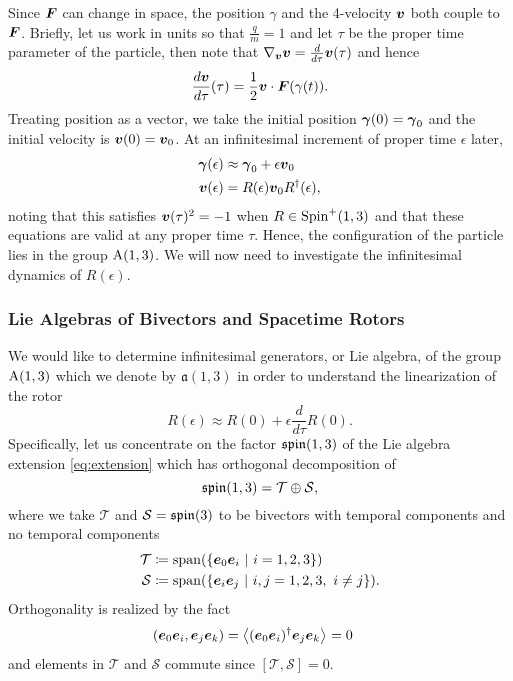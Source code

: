 \documentclass[conf]{new-aiaa}
\begin{document}
Since $\boldsymbol{F}$ can change in space, the position $\gamma$ and the 4-velocity $\boldsymbol{v}$ both couple to $\boldsymbol{F}$. Briefly, let us work in units so that $\frac{q}{m}=1$ and let $\tau$ be the proper time parameter of the particle, then note that $\nabla_{\boldsymbol{v}}\boldsymbol{v}=\frac{d}{d\tau} \boldsymbol{v}(\tau)$ and hence
\begin{equation}
    \label{eq:faraday_transport}
    \frac{d\boldsymbol{v}}{d\tau} (\tau) = \frac{1}{2} \boldsymbol{v}\cdot \boldsymbol{F}(\gamma(t)).
\end{equation}
Treating position as a vector, we take the initial position $\boldsymbol{\gamma}(0)=\boldsymbol{\gamma}_0$ and the initial velocity is $\boldsymbol{v}(0)=\boldsymbol{v}_0$. At an infinitesimal increment of proper time $\epsilon$ later,
\begin{align}
\label{eq:linearization_position}
\boldsymbol{\gamma}(\epsilon) &\approx \boldsymbol{\gamma}_0+\epsilon\boldsymbol{v}_0\\
\boldsymbol{v}(\epsilon) &=  R(\epsilon)\boldsymbol{v}_0 R^\dagger(\epsilon),
\end{align}
noting that this satisfies $\boldsymbol{v}(\tau)^2=-1$ when $R\in \operatorname{Spin}^+(1,3)$ and that these equations are valid at any proper time $\tau$. Hence, the configuration of the particle lies in the group $\operatorname{A}(1,3)$. We will now need to investigate the infinitesimal dynamics of $R(\epsilon)$.

\subsubsection{Lie Algebras of Bivectors and Spacetime Rotors}

We would like to determine infinitesimal generators, or Lie algebra, of the group $\operatorname{A}(1,3)$ which we denote by $\mathfrak{a}(1,3)$ in order to understand the linearization of the rotor
\begin{equation}
\label{eq:linearization_rotor}
R(\epsilon) \approx R(0)+\epsilon\frac{d}{d\tau}R(0).
\end{equation}
Specifically, let us concentrate on the factor $\mathfrak{spin}(1,3)$ of the Lie algebra extension \cref{eq:extension} which has orthogonal decomposition of 
\begin{equation}
    \label{eq:spin_algebra_split}
    \mathfrak{spin}(1,3) = \mathcal{T} \oplus \mathcal{S},
\end{equation}
where we take $\mathcal{T}$ and $\mathcal{S}=\mathfrak{spin}(3)$ to be bivectors with temporal components and no temporal components
\begin{align}
    \mathcal{T} &\coloneqq \mathrm{span}(\{\boldsymbol{e}_0 \boldsymbol{e}_i ~\vert~ i = 1,2,3\})\\
    \mathcal{S} &\coloneqq \mathrm{span}(\{\boldsymbol{e}_i \boldsymbol{e}_j ~\vert~ i,j = 1,2,3, ~ i\neq j\}).
\end{align}
Orthogonality is realized by the fact
\begin{align}
    (\boldsymbol{e}_0 \boldsymbol{e}_i, \boldsymbol{e}_j \boldsymbol{e}_k) &= \left\langle(\boldsymbol{e}_0 \boldsymbol{e}_i)^\dagger \boldsymbol{e}_j \boldsymbol{e}_k\right\rangle_{} = 0
\end{align}
and elements in $\mathcal{T}$ and $\mathcal{S}$ commute since $[\mathcal{T},\mathcal{S}]=0$.
\end{document}
